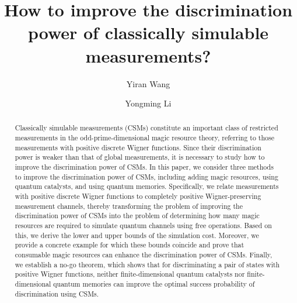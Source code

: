\documentclass[aps,pra,twocolumn,floatfix,amsfonts,10pt]{revtex4-2}
\begin{document}
	
\title{How to improve the discrimination power of classically simulable measurements?}
	
\author{Yiran Wang}
	
\author{Yongming Li}

		
\begin{abstract}
	Classically simulable measurements (CSMs) constitute an important class of restricted measurements in the odd-prime-dimensional magic resource theory, referring to those measurements with positive discrete Wigner functions. 
	Since their discrimination power is weaker than that of global measurements, it is necessary to study how to improve the discrimination power of CSMs. 
	In this paper, we consider three methods to improve the discrimination power of CSMs, including adding magic resources, using quantum catalysts, and using quantum memories.
	Specifically, we relate measurements with positive discrete Wigner functions to completely positive Wigner-preserving measurement channels, thereby transforming the problem of improving the discrimination power of CSMs into the problem of determining how many magic resources are required to simulate quantum channels using free operations.
	Based on this, we derive the lower and upper bounds of the simulation cost.
	Moreover, we provide a concrete example for which these bounds coincide and prove that consumable magic resources can enhance the discrimination power of CSMs.
	Finally, we establish a no-go theorem, which shows that for discriminating a pair of states with positive Wigner functions, neither finite-dimensional quantum catalysts nor finite-dimensional quantum memories can improve the optimal success probability of discrimination using CSMs.
\end{abstract}
	
\maketitle
\end{document}
